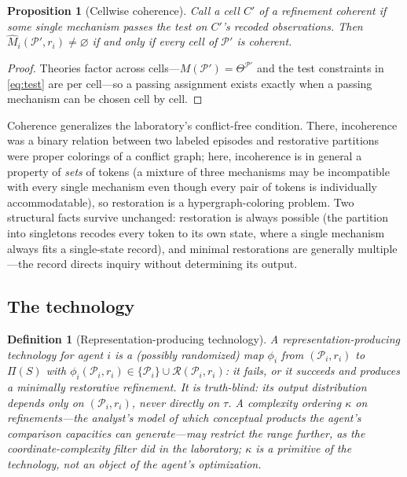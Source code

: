 \documentclass[11pt]{article}
\newtheorem{definition}[assumption]{Definition}
\newtheorem{proposition}[assumption]{Proposition}
\newcommand{\emptysetset}{\varnothing}
\begin{document}
\begin{proposition}[Cellwise coherence]
\label{prop:coherence}
Call a cell $C'$ of a refinement \emph{coherent} if some single mechanism
passes the test on $C'$'s recoded observations.  Then
$\widehat M_i(\mathcal P',r_i)\neq\emptysetset$ if and only if every cell of
$\mathcal P'$ is coherent.
\end{proposition}

\begin{proof}
Theories factor across cells---$M(\mathcal P')=\Theta^{\mathcal P'}$ and the
test constraints in \cref{eq:test} are per cell---so a passing assignment
exists exactly when a passing mechanism can be chosen cell by cell.
\end{proof}

Coherence generalizes the laboratory's conflict-free condition.  There,
incoherence was a binary relation between two labeled episodes and restorative
partitions were proper colorings of a conflict graph; here, incoherence is in
general a property of \emph{sets} of tokens (a mixture of three mechanisms may
be incompatible with every single mechanism even though every pair of tokens
is individually accommodatable), so restoration is a hypergraph-coloring
problem.  Two structural facts survive unchanged: restoration is always
possible (the partition into singletons recodes every token to its own state,
where a single mechanism always fits a single-state record), and minimal
restorations are generally multiple---the record directs inquiry without
determining its output.

\subsection{The technology}

\begin{definition}[Representation-producing technology]
\label{def:technology}
A representation-producing technology for agent $i$ is a (possibly randomized)
map $\phi_i$ from $(\mathcal P_i,r_i)$ to $\Pi(S)$ with
$\phi_i(\mathcal P_i,r_i)\in\{\mathcal P_i\}\cup
\mathcal R(\mathcal P_i,r_i)$: it fails, or it succeeds and produces a
minimally restorative refinement.  It is \emph{truth-blind}: its output
distribution depends only on $(\mathcal P_i,r_i)$, never directly on $\tau$.
A complexity ordering $\kappa$ on refinements---the analyst's model of which
conceptual products the agent's comparison capacities can generate---may
restrict the range further, as the coordinate-complexity filter did in the
laboratory; $\kappa$ is a primitive of the technology, not an object of the
agent's optimization.
\end{definition}
\end{document}

